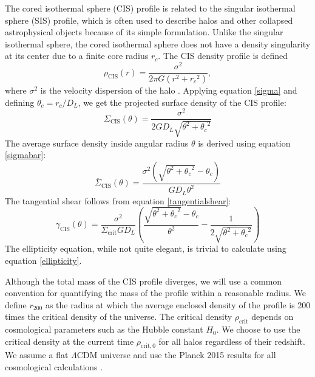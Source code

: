 \documentclass[10pt]{article}
\begin{document}
The cored isothermal sphere (CIS) profile is related to the singular isothermal sphere (SIS) profile, which is often used to describe halos and other collapsed astrophysical objects because of its simple formulation. Unlike the singular isothermal sphere, the cored isothermal sphere does not have a density singularity at its center due to a finite core radius $r_c$. The CIS density profile is defined
\begin{equation} \label{cisdensity}
\rho_\mathrm{CIS}(r) = \frac{\sigma^2}{2\pi G (r^2 + {r_c}^2)},
\end{equation}
where $\sigma^2$ is the velocity dispersion of the halo \citep{Chen2005, Shapiro1999}. Applying equation \ref{sigma} and defining $\theta_c = r_c/D_L$, we get the projected surface density of the CIS profile:
\begin{equation}
\Sigma_\mathrm{CIS}(\theta) = \frac{\sigma^2}{2 G D_L \sqrt{\theta^2 + {\theta_c}^2}}
\end{equation}
The average surface density inside angular radius $\theta$ is derived using equation \ref{sigmabar}:
\begin{equation}
\overline{\Sigma}_\mathrm{CIS}(\theta) = \frac{\sigma^2 \left(\sqrt{\theta^2 + {\theta_c}^2} - \theta_c \right)}{G D_L \theta^2}
\end{equation}
The tangential shear follows from equation \ref{tangentialshear}:
\begin{equation}
\gamma_\mathrm{CIS}(\theta) = \frac{\sigma^2}{\Sigma_\mathrm{crit} G D_L} \left(\frac{\sqrt{\theta^2 + {\theta_c}^2} - \theta_c}{\theta^2} - \frac{1}{2 \sqrt{\theta^2 + {\theta_c}^2}}\right)
\end{equation}
The ellipticity equation, while not quite elegant, is trivial to calculate using equation \ref{ellipticity}.

Although the total mass of the CIS profile diverges, we will use a common convention for quantifying the mass of the profile within a reasonable radius. We define $r_{200}$ as the radius at which the average enclosed density of the profile is 200 times the critical density of the universe. The critical density $\rho_\mathrm{crit}$ depends on cosmological parameters such as the Hubble constant $H_0$. We choose to use the critical density at the current time $\rho_\mathrm{crit,0}$ for all halos regardless of their redshift. We assume a flat $\Lambda$CDM universe and use the Planck 2015 results for all cosmological calculations \citep{PlanckCollaboration2015}.
\end{document}
